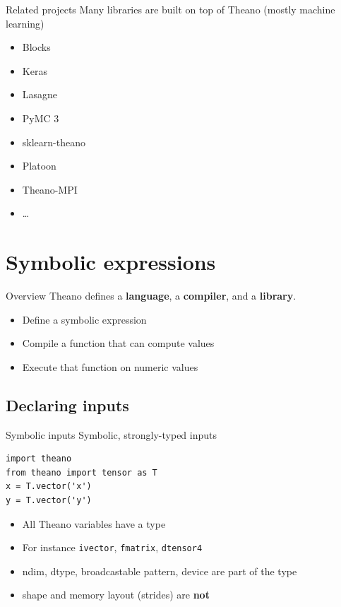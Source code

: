 \documentclass[a4paper,9pt]{beamer}
\begin{document}
\begin{frame}{Related projects}
  Many libraries are built on top of Theano (mostly machine learning)
  \begin{itemize}
  \item Blocks
  \item Keras
  \item Lasagne
  \item PyMC 3
  \item sklearn-theano
  \item Platoon
  \item Theano-MPI
  \item \ldots
  \end{itemize}
\end{frame}


\section{Symbolic expressions}
\begin{frame}{Overview}
  Theano defines a {\bf language}, a {\bf compiler}, and a {\bf library}.
  \begin{itemize}
    \item Define a symbolic expression
    \item Compile a function that can compute values
    \item Execute that function on numeric values
  \end{itemize}
\end{frame}

\subsection{Declaring inputs}
\begin{frame}[fragile]{Symbolic inputs}
  Symbolic, strongly-typed inputs
  \begin{verbatim}
import theano
from theano import tensor as T
x = T.vector('x')
y = T.vector('y')
  \end{verbatim}

  \begin{itemize}
    \item All Theano variables have a type
    \item For instance \verb|ivector|, \verb|fmatrix|, \verb|dtensor4|
    \item ndim, dtype, broadcastable pattern, device are part of the type
    \item shape and memory layout (strides) are {\bf not}
  \end{itemize}
\end{frame}
\end{document}
